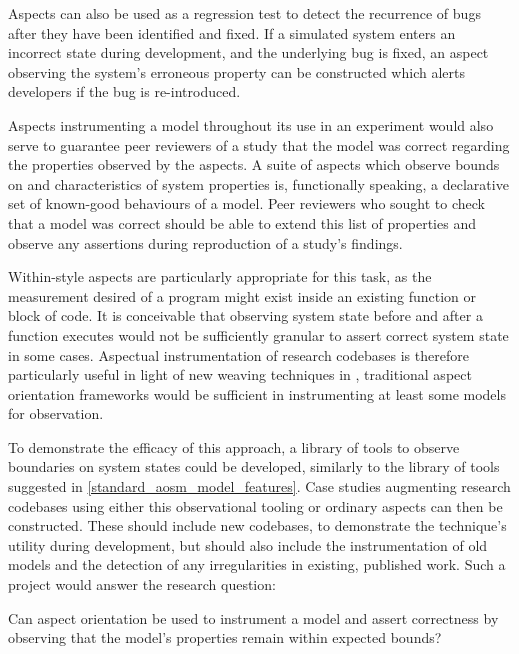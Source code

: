 Aspects can also be used as a regression test to detect the recurrence of bugs
after they have been identified and fixed. If a simulated system enters an
incorrect state during development, and the underlying bug is fixed, an aspect
observing the system's erroneous property can be constructed which alerts
developers if the bug is re-introduced.

Aspects instrumenting a model throughout its use in an experiment would also
serve to guarantee peer reviewers of a study that the model was correct
regarding the properties observed by the aspects. A suite of aspects which
observe bounds on and characteristics of system properties is, functionally
speaking, a declarative set of known-good behaviours of a model. Peer reviewers
who sought to check that a model was correct should be able to extend this list
of properties and observe any assertions during reproduction of a study's
findings.

Within-style aspects are particularly appropriate for this task, as the
measurement desired of a program might exist inside an existing function or
block of code. It is conceivable that observing system state before and after a
function executes would not be sufficiently granular to assert correct system
state in some cases. Aspectual instrumentation of research codebases is
therefore particularly useful in light of new weaving techniques in \pdsf,
traditional aspect orientation frameworks would be sufficient in instrumenting
at least some models for observation.

To demonstrate the efficacy of this approach, a library of tools to observe
boundaries on system states could be developed, similarly to the library of
tools suggested in \cref{standard_aosm_model_features}. Case studies augmenting
research codebases using either this observational tooling or ordinary aspects
can then be constructed. These should include new codebases, to demonstrate the
technique's utility during development, but should also include the
instrumentation of old models and the detection of any irregularities in
existing, published work. Such a project would answer the research question:

\begin{researchquestion}
    Can aspect orientation be used to instrument a model and assert correctness
    by observing that the model's properties remain within expected bounds?
\end{researchquestion}



